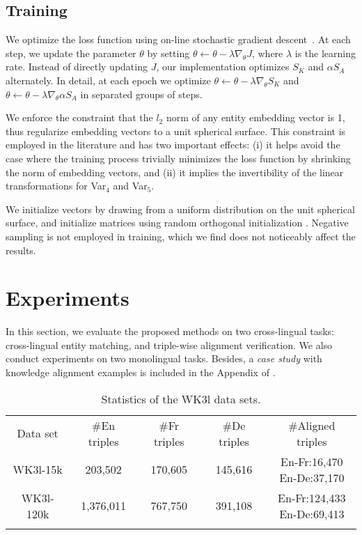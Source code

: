 \documentclass{article}
\def\inv{\vspace{-0.1cm}}
\begin{document}
\inv\inv
\subsection{Training}

We optimize the loss function using on-line stochastic gradient descent~\cite{wilson2003general}.
At each step, we update the parameter $\theta$ by setting
$
\theta \leftarrow  \theta - \lambda \nabla_\theta J
$,
where $\lambda$ is the learning rate.
Instead of directly updating $J$, our implementation optimizes $S_K$ and $\alpha S_A$ alternately.
In detail, at each epoch we optimize $\theta \leftarrow  \theta - \lambda \nabla_\theta S_K$ and $\theta \leftarrow  \theta - \lambda \nabla_\theta \alpha S_A$ in separated groups of steps.

	




We enforce the constraint that the $l_2$ norm of any entity embedding vector is 1,
thus regularize embedding vectors to a unit spherical surface.
This constraint is employed in the literature
\cite{bordes2013translating,bordes2014open,jenatton2012latent} and has two important effects:
(i) it helps avoid the case where the training process trivially minimizes the loss function by shrinking the norm of embedding vectors, and
(ii) it implies the invertibility of the linear transformations \cite{xing2015normalized} for Var$_4$ and Var$_5$.


We initialize vectors by drawing from a uniform distribution on the unit spherical surface,
and initialize matrices using random orthogonal initialization \cite{saxe2013exact}.
Negative sampling is not employed in training, which we find does not noticeably affect the \mbox{results}.
\def\hits{\mathit{Hits}\mbox{@}10}
\def\mean{\mathit{Mean}}

\inv
\section{Experiments}

In this section, we evaluate the proposed methods on two cross-lingual tasks: cross-lingual entity matching, and triple-wise alignment verification.
We also conduct experiments on two monolingual tasks. Besides, a \emph{case study} with knowledge alignment examples is included in the Appendix of \cite{chen2016arxiv}.

\begin{table}[t]
\centering
\caption{Statistics of the WK3l data sets.}
\label{tbl:statistics}
\vspace{-1em}
\scriptsize
\begin{tabular}{c|cccc}
\bhline
Data set&\#En triples&\#Fr triples&\#De triples&\#Aligned triples\\
\bhline
WK3l-15k&203,502&170,605&145,616&\makecell{En-Fr:16,470\\En-De:37,170}\\
\hline
WK3l-120k&1,376,011&767,750&391,108&\makecell{En-Fr:124,433\\En-De:69,413}\\
\bhline
\end{tabular}
\vspace{-1em}
\end{table}
\end{document}
